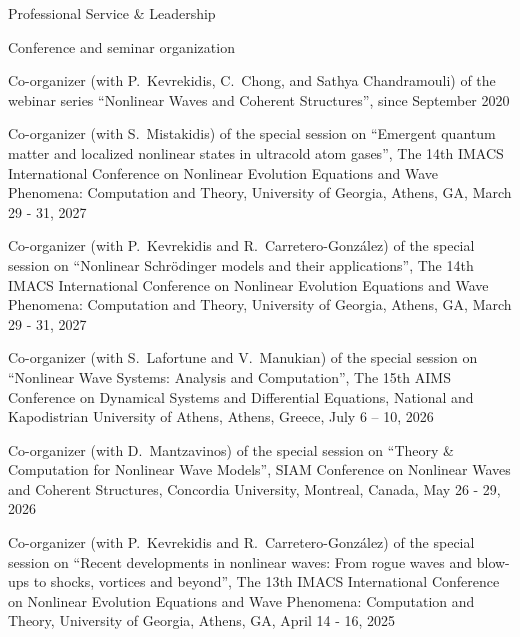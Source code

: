 \documentclass[10pt]{article} %
\newenvironment{outerlist}[1][\enskip\textbullet]%
        {\begin{itemize}[#1]}{\end{itemize}%
         \vspace{-.6\baselineskip}}
\newenvironment{innerlist}[1][\enskip\textbullet]%
        {\begin{compactitem}[#1]}{\end{compactitem}}
\begin{document}
\begin{section}{Professional Service \& Leadership}
\begin{outerlist}
\item[$\bullet$]  \vskip -7mm Conference and seminar organization
\begin{innerlist}
\item[$\triangleright$] Co-organizer (with P.~Kevrekidis, C.~Chong, and Sathya Chandramouli) of the webinar series ``Nonlinear Waves and Coherent Structures'', since September 2020
\item [$\triangleright$] Co-organizer (with S.~Mistakidis) of the special session on ``Emergent quantum matter and localized nonlinear states in ultracold atom gases'', The 14th IMACS International Conference on Nonlinear Evolution Equations and Wave Phenomena: Computation and Theory, University of Georgia, Athens, GA, March 29 - 31, 2027
\item [$\triangleright$] Co-organizer (with P.~Kevrekidis and R.~Carretero-Gonz{\'a}lez) of
                        the special session on ``Nonlinear Schrödinger models and their applications'',
                        The 14th IMACS International Conference on Nonlinear Evolution Equations and Wave Phenomena:
                        Computation and Theory, University of Georgia, Athens, GA, March 29 - 31, 2027
\item[$\triangleright$] Co-organizer (with S.~Lafortune and V.~Manukian) of the special session on ``Nonlinear Wave Systems: Analysis and Computation'', The 15th AIMS Conference on Dynamical Systems and Differential Equations, National and Kapodistrian University of Athens, Athens, Greece, July 6 – 10, 2026
\item[$\triangleright$] Co-organizer (with D.~Mantzavinos) of the special session on ``Theory \& Computation for Nonlinear Wave Models'', SIAM Conference on Nonlinear Waves and Coherent Structures, Concordia University, Montreal, Canada, May 26 - 29, 2026
\item[$\triangleright$] Co-organizer (with P.~Kevrekidis and R.~Carretero-Gonz{\'a}lez) of
                        the special session on ``Recent developments in nonlinear waves: From rogue waves and blow-ups
                        to shocks, vortices and beyond'',
                        The 13th IMACS International Conference on Nonlinear Evolution Equations and Wave Phenomena:
                        Computation and Theory, University of Georgia, Athens, GA, April 14 - 16, 2025

\end{innerlist}
\end{outerlist}
\end{section}
\end{document}
